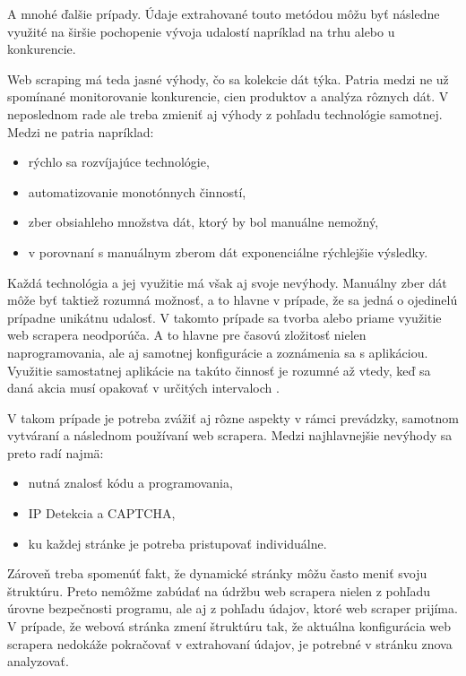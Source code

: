 A mnohé ďalšie prípady. Údaje extrahované touto metódou môžu byť následne využité na širšie pochopenie vývoja udalostí napríklad na trhu alebo u konkurencie.

Web scraping má teda jasné výhody, čo sa kolekcie dát týka. Patria medzi ne už spomínané monitorovanie konkurencie, cien produktov a analýza rôznych dát. V neposlednom rade ale treba zmieniť aj výhody z pohľadu technológie samotnej. Medzi ne patria napríklad:

\begin{itemize}
    \item rýchlo sa rozvíjajúce technológie,
    \item automatizovanie monotónnych činností,
    \item zber obsiahleho množstva dát, ktorý by bol manuálne nemožný,
    \item v porovnaní s manuálnym zberom dát exponenciálne rýchlejšie výsledky.
\end{itemize}

Každá technológia a jej využitie má však aj svoje nevýhody. Manuálny zber dát môže byť taktiež rozumná možnosť, a to hlavne v prípade, že sa jedná o ojedinelú prípadne unikátnu udalosť. V takomto prípade sa tvorba alebo priame využitie web scrapera neodporúča. A to hlavne pre časovú zložitosť nielen naprogramovania, ale aj samotnej konfigurácie a zoznámenia sa s aplikáciou. Využitie samostatnej aplikácie na takúto činnosť je rozumné až vtedy, keď sa daná akcia musí opakovať v určitých intervaloch \cite{WebScrap}. 

V takom prípade je potreba zvážiť aj rôzne aspekty v rámci prevádzky, samotnom vytváraní a následnom používaní web scrapera. Medzi najhlavnejšie nevýhody sa preto radí najmä:

\begin{itemize}
    \item nutná znalosť kódu a programovania,
    \item IP Detekcia a CAPTCHA,
    \item ku každej stránke je potreba pristupovať individuálne.
\end{itemize}

Zároveň treba spomenúť fakt, že dynamické stránky môžu často meniť svoju štruktúru. Preto nemôžme zabúdať na údržbu web scrapera nielen z pohľadu úrovne bezpečnosti programu, ale aj z pohľadu údajov, ktoré web scraper prijíma. V prípade, že webová stránka zmení štruktúru tak, že aktuálna konfigurácia web scrapera nedokáže pokračovať v extrahovaní údajov, je potrebné v stránku znova analyzovať. 


